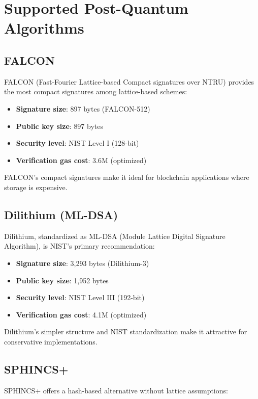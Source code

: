 \section{Supported Post-Quantum Algorithms}


\subsection{FALCON}

FALCON (Fast-Fourier Lattice-based Compact signatures over NTRU) provides the most compact signatures among lattice-based schemes:

\begin{itemize}
\item \textbf{Signature size}: 897 bytes (FALCON-512)
\item \textbf{Public key size}: 897 bytes
\item \textbf{Security level}: NIST Level I (128-bit)
\item \textbf{Verification gas cost}: 3.6M (optimized)
\end{itemize}

FALCON's compact signatures make it ideal for blockchain applications where storage is expensive.

\subsection{Dilithium (ML-DSA)}

Dilithium, standardized as ML-DSA (Module Lattice Digital Signature Algorithm), is NIST's primary recommendation:

\begin{itemize}
\item \textbf{Signature size}: 3,293 bytes (Dilithium-3)
\item \textbf{Public key size}: 1,952 bytes
\item \textbf{Security level}: NIST Level III (192-bit)
\item \textbf{Verification gas cost}: 4.1M (optimized)
\end{itemize}

Dilithium's simpler structure and NIST standardization make it attractive for conservative implementations.

\subsection{SPHINCS+}

SPHINCS+ offers a hash-based alternative without lattice assumptions:

